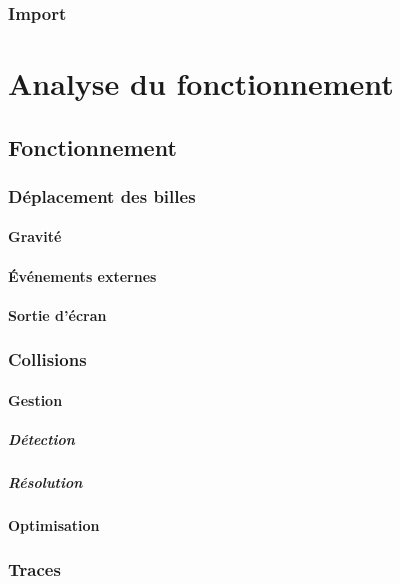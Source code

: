 \documentclass{report}
\begin{document}
\subsubsection{Import}

\section{Analyse du fonctionnement}

\subsection{Fonctionnement}

\subsubsection{Déplacement des billes}

\paragraph{Gravité}

\paragraph{Événements externes}

\paragraph{Sortie d'écran}

\subsubsection{Collisions}

\paragraph{Gestion}

\subparagraph{Détection}

\subparagraph{Résolution}

\paragraph{Optimisation}

\subsubsection{Traces}
\end{document}
